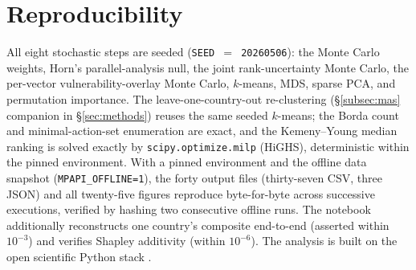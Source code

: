 \documentclass[11pt]{article}
\begin{document}
\section{Reproducibility}\label{app:repro}
All eight stochastic steps are seeded (\texttt{SEED $=$ 20260506}): the Monte Carlo weights, Horn's parallel-analysis null, the joint rank-uncertainty Monte Carlo, the per-vector vulnerability-overlay Monte Carlo, $k$-means, MDS, sparse PCA, and permutation importance. The leave-one-country-out re-clustering (\S\ref{subsec:mas} companion in \S\ref{sec:methods}) reuses the same seeded $k$-means; the Borda count and minimal-action-set enumeration are exact, and the Kemeny--Young median ranking is solved exactly by \texttt{scipy.optimize.milp} (HiGHS), deterministic within the pinned environment. With a pinned environment and the offline data snapshot (\texttt{MPAPI\_OFFLINE=1}), the forty output files (thirty-seven CSV, three JSON) and all twenty-five figures reproduce byte-for-byte across successive executions, verified by hashing two consecutive offline runs. The notebook additionally reconstructs one country's composite end-to-end (asserted within $10^{-3}$) and verifies Shapley additivity (within $10^{-6}$). The analysis is built on the open scientific Python stack \citep{harris2020numpy,mckinney2010pandas,virtanen2020scipy,pedregosa2011scikit,hunter2007matplotlib,waskom2021seaborn}.
\end{document}
